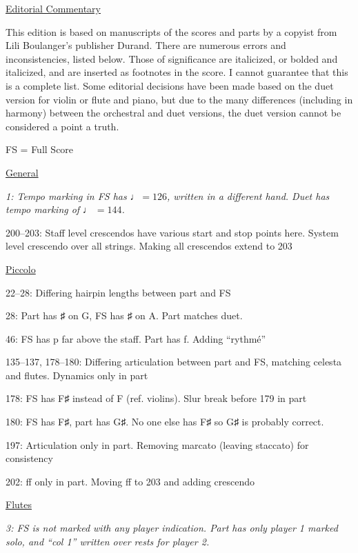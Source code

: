 \documentclass[twoside]{article}
\begin{document}
\begin{center}
\underline{\huge{Editorial Commentary}}
\end{center}

This edition is based on manuscripts of the scores and parts by a copyist from Lili Boulanger's publisher Durand. There are numerous errors and inconsistencies, listed below. Those of significance are italicized, or bolded and italicized, and are inserted as footnotes in the score. I cannot guarantee that this is a complete list. Some editorial decisions have been made based on the duet version for violin or flute and piano, but due to the many differences (including in harmony) between the orchestral and duet versions, the duet version cannot be considered a point a truth.

\begin{hangparas}{15pt}{1}
\bigbreak
FS = Full Score
\begin{multicols}{2}

\underline{General}

\textit{1: Tempo marking in FS has }$\quarternote=126$\textit{, written in a different hand. Duet has tempo marking of }$\quarternote\ =144$\textit{.}

200--203: Staff level crescendos have various start and stop points here. System level crescendo over all strings. Making all crescendos extend to 203

\underline{Piccolo}

22--28: Differing hairpin lengths between part and FS

28: Part has ♯ on G, FS has ♯ on A. Part matches duet.

46: FS has p far above the staff. Part has f. Adding ``rythmé''

135--137, 178--180: Differing articulation between part and FS, matching celesta and flutes. Dynamics only in part

178: FS has F♯ instead of F (ref. violins). Slur break before 179 in part

180: FS has F♯, part has G♯. No one else has F♯ so G♯ is probably correct.

197: Articulation only in part. Removing marcato (leaving staccato) for consistency

202: ff only in part. Moving ff to 203 and adding crescendo

\underline{Flutes}

\textit{3: FS is not marked with any player indication. Part has only player 1 marked solo, and ``col 1'' written over rests for player 2.}


\end{multicols}
\end{hangparas}
\end{document}
